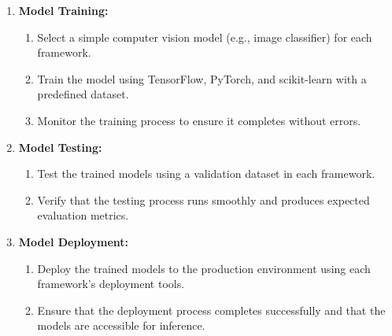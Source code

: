 \documentclass[12pt, titlepage]{article}
\begin{document}
\begin{enumerate}
\begin{enumerate}
    \item \textbf{Model Training:}
    \begin{enumerate}
        \item Select a simple computer vision model (e.g., image classifier) for each framework.
        \item Train the model using TensorFlow, PyTorch, and scikit-learn with a predefined dataset.
        \item Monitor the training process to ensure it completes without errors.
    \end{enumerate}
    
    \item \textbf{Model Testing:}
    \begin{enumerate}
        \item Test the trained models using a validation dataset in each framework.
        \item Verify that the testing process runs smoothly and produces expected evaluation metrics.
    \end{enumerate}
    
    \item \textbf{Model Deployment:}
    \begin{enumerate}
        \item Deploy the trained models to the production environment using each framework's deployment tools.
        \item Ensure that the deployment process completes successfully and that the models are accessible for inference.
    \end{enumerate}
    
\end{enumerate}

\end{enumerate}

\end{document}

